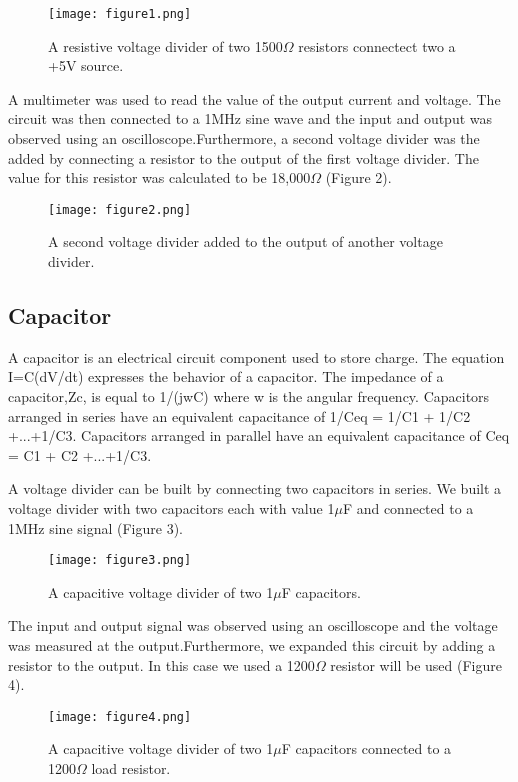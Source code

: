 \documentclass[12pt]{article}
\begin{document}
\begin {figure}[h!]
\centering 
\texttt{[image: figure1.png]}
\caption{\label{rvd} A resistive voltage divider of two 1500$\Omega$ 
resistors connectect two a +5V source. }
\end {figure}

A multimeter was used to read the value of the output current and
voltage. The circuit was then connected to a 1MHz sine wave and the
input and output was observed using an oscilloscope.Furthermore, a
second voltage divider was the added by connecting a resistor to the
output of the first voltage divider. The value for this resistor was
calculated to be 18,000$\Omega$ (Figure 2).

\begin {figure}[h!]
\centering
\texttt{[image: figure2.png]}
\caption{\label{rvd} A second voltage divider added to the output of
another voltage divider. }
\end {figure} 

\subsection {Capacitor}
A capacitor is an electrical circuit component used to store charge. The
equation I=C(dV/dt) expresses the behavior of a capacitor. The impedance
of a capacitor,Zc, is equal to 1/(jwC) where w is the angular
frequency. Capacitors arranged in series have an equivalent capacitance
of 1/Ceq = 1/C1 + 1/C2 +...+1/C3. Capacitors arranged in parallel have
an equivalent capacitance of Ceq = C1 + C2 +...+1/C3. 

A voltage divider can be built by connecting two capacitors in
series. We built a voltage divider with two capacitors each with value
1$\mu$F and connected to a 1MHz sine signal (Figure 3).

\begin {figure}[h!]
\centering
\texttt{[image: figure3.png]}
\caption{\label{rvd} A capacitive voltage divider of two 1$\mu$F
capacitors. }
\end {figure}

The input and output signal was observed using an oscilloscope and the
voltage was measured at the output.Furthermore, we expanded this circuit
by adding a resistor to the output. In this case we used a 1200$\Omega$
resistor will be used (Figure 4).

\begin {figure}[h!]
\centering
\texttt{[image: figure4.png]}
\caption{\label{rvd} A capacitive voltage divider of two 1$\mu$F                                
capacitors connected to a 1200$\Omega$ load resistor. }
\end {figure}
\end{document}
